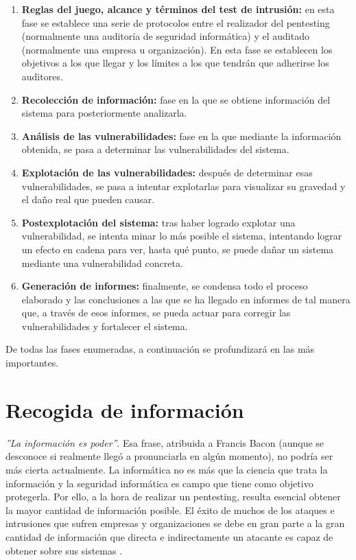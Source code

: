 \begin{enumerate}
	\item \textbf{Reglas del juego, alcance y términos del test de intrusión:} en esta fase se establece una serie de protocolos entre el realizador del pentesting (normalmente una auditoría de seguridad informática) y el auditado (normalmente una empresa u organización). En esta fase se establecen los objetivos a los que llegar y los límites a los que tendrán que adherirse los auditores.
	\item \textbf{Recolección de información:} fase en la que se obtiene información del sistema para posteriormente analizarla.
	\item \textbf{Análisis de las vulnerabilidades:} fase en la que mediante la información obtenida, se pasa a determinar las vulnerabilidades del sistema.
	\item \textbf{Explotación de las vulnerabilidades:} después de determinar esas vulnerabilidades, se pasa a intentar explotarlas para visualizar su gravedad y el daño real que pueden causar.
	\item \textbf{Postexplotación del sistema:} tras haber logrado explotar una vulnerabilidad, se intenta minar lo más posible el sistema, intentando lograr un efecto en cadena para ver, hasta qué punto, se puede dañar un sistema mediante una vulnerabilidad concreta.
	\item \textbf{Generación de informes:} finalmente, se condensa todo el proceso elaborado y las conclusiones a las que se ha llegado en informes de tal manera que, a través de esos informes, se pueda actuar para corregir las vulnerabilidades y fortalecer el sistema.
\end{enumerate}

De todas las fases enumeradas, a continuación se profundizará en las más importantes.

\section{Recogida de información}

\textit{''La información es poder''}. Esa frase, atribuida a Francis Bacon (aunque se desconoce si realmente llegó a pronunciarla en algún momento), no podría ser más cierta actualmente. La informática no es más que la ciencia que trata la información y la seguridad informática es campo que tiene como objetivo protegerla. Por ello, a la hora de realizar un pentesting, resulta esencial obtener la mayor cantidad de información posible. El éxito de muchos de los ataques e intrusiones que sufren empresas y organizaciones se debe en gran parte a la gran cantidad de información que directa e indirectamente un atacante es capaz de obtener sobre sus sistemas \cite{inteco-gathering}.

